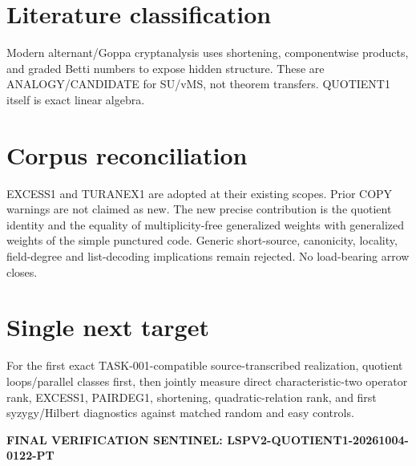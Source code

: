 \documentclass{article}
\begin{document}
\section*{Literature classification}
Modern alternant/Goppa cryptanalysis uses shortening, componentwise products, and graded Betti numbers to expose hidden structure. These are ANALOGY/CANDIDATE for SU/vMS, not theorem transfers. QUOTIENT1 itself is exact linear algebra.

\section*{Corpus reconciliation}
EXCESS1 and TURANEX1 are adopted at their existing scopes. Prior COPY warnings are not claimed as new. The new precise contribution is the quotient identity and the equality of multiplicity-free generalized weights with generalized weights of the simple punctured code. Generic short-source, canonicity, locality, field-degree and list-decoding implications remain rejected. No load-bearing arrow closes.

\section*{Single next target}
For the first exact TASK-001-compatible source-transcribed realization, quotient loops/parallel classes first, then jointly measure direct characteristic-two operator rank, EXCESS1, PAIRDEG1, shortening, quadratic-relation rank, and first syzygy/Hilbert diagnostics against matched random and easy controls.

\textbf{FINAL VERIFICATION SENTINEL: LSPV2-QUOTIENT1-20261004-0122-PT}
\end{document}
